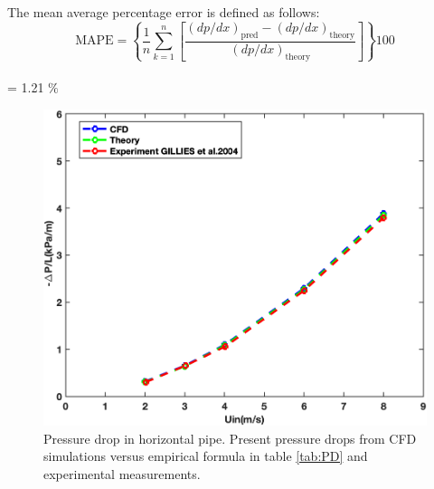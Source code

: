 \documentclass[review,3p,times,12pt]{elsarticle}
\begin{document}
\vspace{-2cm}\begin{minipage}[t]{0.45\textwidth}
\vspace{2.5cm}
The mean average percentage error is defined as follows:
\footnotesize{$$
\text{MAPE}=\left\{\frac{1}{n} \sum_{k=1}^{n}\left[\frac{(d p / d x)_{\text{pred}}-(d p / d x)_{\text{theory} }}{(d p / d x)_{\text{theory}}}\right]\right\} 100
$$\\
 = 1.21 $\%$}
\end{minipage} \hfill 
\begin{minipage}[t]{0.55\textwidth}
\begin{figure}[H]
\begin{center}
\includegraphics[scale = 0.45]{figs/WH}
\caption{ Pressure drop in horizontal pipe. 
Present pressure drops from CFD simulations versus empirical formula in table \ref{tab:PD} and experimental measurements.}\label{horiz:theo}
\end{center}
\end{figure}
\end{minipage}\\
\end{document}
